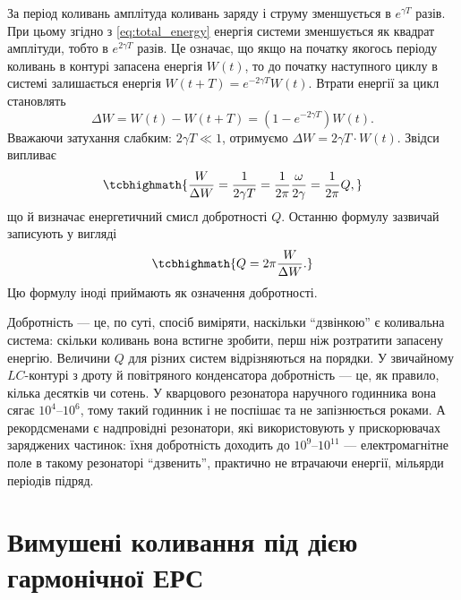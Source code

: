 За період коливань амплітуда коливань заряду і струму зменшується в
$e^{\gamma T}$ разів. При цьому згідно з \eqref{eq:total_energy} енергія системи зменшується як квадрат амплітуди, тобто в $e^{2\gamma T}$ разів. Це означає, що якщо на початку якогось періоду коливань в контурі запасена енергія $W(t)$, то до початку
наступного циклу в системі залишається енергія $W(t + T) = e^{-2\gamma T}W(t)$. Втрати енергії за цикл становлять
\begin{equation}\label{eq:energy_loss_cycle}
	\Delta W = W(t) - W(t + T) = \left(1 - e^{-2\gamma T}\right)W(t).
\end{equation}
Вважаючи затухання слабким: $2\gamma T \ll 1$, отримуємо $\Delta W = 2\gamma T \cdot W(t)$. Звідси
випливає
\begin{equation}\label{eq:quality_energy}
	\tcbhighmath{
		\frac{W}{\Delta W} = \frac{1}{2\gamma T} = \frac{1}{2\pi}\frac{\omega}{2\gamma} = \frac{1}{2\pi}Q,
	}
\end{equation}
що й визначає енергетичний смисл добротності $Q$. Останню
формулу зазвичай записують у вигляді
\begin{equation}\label{eq:Q_definition}
	\tcbhighmath{
		Q = 2\pi\frac{W}{\Delta W}.
	}
\end{equation}
Цю формулу іноді приймають як означення добротності.

\begin{Attention}
	Добротність --- це, по суті, спосіб виміряти, наскільки \enquote{дзвінкою} є коливальна система: скільки коливань вона встигне зробити, перш ніж розтратити запасену енергію. Величини $Q$ для різних систем відрізняються на порядки. У звичайному $LC$-контурі з дроту й повітряного конденсатора добротність --- це, як правило, кілька десятків чи сотень. У кварцового резонатора наручного годинника вона сягає $10^{4}$--$10^{6}$, тому такий годинник і не поспішає та не запізнюється роками. А рекордсменами є надпровідні резонатори, які використовують у прискорювачах заряджених частинок: їхня добротність доходить до $10^{9}$--$10^{11}$ --- електромагнітне поле в такому резонаторі \enquote{дзвенить}, практично не втрачаючи енергії, мільярди періодів підряд.
\end{Attention}

\section{Вимушені коливання під дією гармонічної ЕРС}\hypertarget{forced-oscillations}{}

